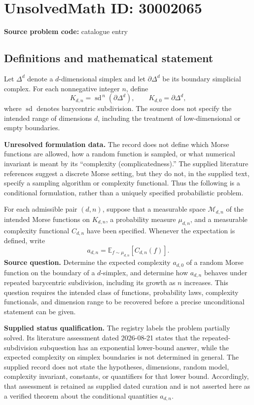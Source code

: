 \documentclass[11pt]{article}
\begin{document}
\section*{UnsolvedMath ID: 30002065}
\textbf{Source problem code:} catalogue entry
\subsection{Definitions and mathematical statement}
Let \(\Delta^d\) denote a \(d\)-dimensional simplex and let \(\partial\Delta^d\) be its boundary simplicial complex. For each nonnegative integer \(n\), define
\[
K_{d,n}=\operatorname{sd}^{\,n}(\partial\Delta^d),
\qquad K_{d,0}=\partial\Delta^d,
\]
where \(\operatorname{sd}\) denotes barycentric subdivision. The source does not specify the intended range of dimensions \(d\), including the treatment of low-dimensional or empty boundaries.

\textbf{Unresolved formulation data.} The record does not define which Morse functions are allowed, how a random function is sampled, or what numerical invariant is meant by its ``complexity (complicatedness).'' The supplied literature references suggest a discrete Morse setting, but they do not, in the supplied text, specify a sampling algorithm or complexity functional. Thus the following is a conditional formulation, rather than a uniquely specified probabilistic problem.

For each admissible pair \((d,n)\), suppose that a measurable space \(\mathcal M_{d,n}\) of the intended Morse functions on \(K_{d,n}\), a probability measure \(\mu_{d,n}\), and a measurable complexity functional \(C_{d,n}\) have been specified. Whenever the expectation is defined, write
\[
a_{d,n}=\mathbb E_{f\sim\mu_{d,n}}\!\left[C_{d,n}(f)\right].
\]
\textbf{Source question.} Determine the expected complexity \(a_{d,0}\) of a random Morse function on the boundary of a \(d\)-simplex, and determine how \(a_{d,n}\) behaves under repeated barycentric subdivision, including its growth as \(n\) increases. This question requires the intended class of functions, probability laws, complexity functionals, and dimension range to be recovered before a precise unconditional statement can be given.

\textbf{Supplied status qualification.} The registry labels the problem partially solved. Its literature assessment dated 2026-08-21 states that the repeated-subdivision subquestion has an exponential lower-bound answer, while the expected complexity on simplex boundaries is not determined in general. The supplied record does not state the hypotheses, dimensions, random model, complexity invariant, constants, or quantifiers for that lower bound. Accordingly, that assessment is retained as supplied dated curation and is not asserted here as a verified theorem about the conditional quantities \(a_{d,n}\).
\end{document}
